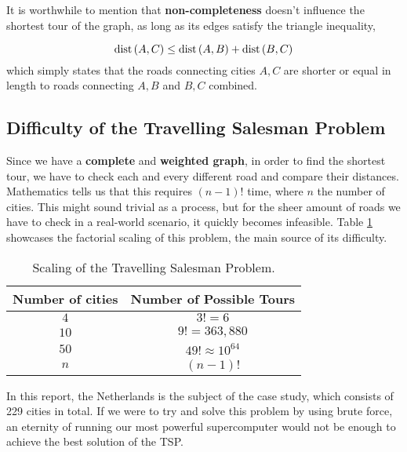 It is worthwhile to mention that \textbf{non-completeness} doesn't influence the shortest tour of the graph, as long as its edges satisfy the triangle inequality,

\[
	\operatorname*{dist}{(A, C)} \leq \operatorname*{dist}{(A, B)} + \operatorname*{dist}{(B, C)}
\]
which simply states that the roads connecting cities \( A, C \) are shorter or equal in length to roads connecting \(A, B\) and \(B, C\) combined.

\subsection{Difficulty of the Travelling Salesman Problem}
Since we have a \textbf{complete} and \textbf{weighted graph}, in order to find the shortest tour, we have to check each and every different road and compare their distances. Mathematics tells us that this requires \( (n-1)! \) time, where \( n \) the number of cities. This might sound trivial as a process, but for the sheer amount of roads we have to check in a real-world scenario, it quickly becomes infeasible. Table \ref{table: factorial_growth} showcases the factorial scaling of this problem, the main source of its difficulty.

\begin{table}
	\centering
	\begin{tabular}{|c|c|}
		\hline
		\textbf{Number of cities}	&	\textbf{Number of Possible Tours} \\
		\hline
		\( 4 \)						&	\( 3! = 6 \)				\\
		\( 10 \)					&	\( 9! = 363,880 \)			\\
		\( 50 \)					&	\( 49! \approx 10^{64} \)	\\
		\( n \)						&	\( (n-1)! \)				\\
		\hline
	\end{tabular}
	\caption{Scaling of the Travelling Salesman Problem.}
	\label{table: factorial_growth}
\end{table}

In this report, the Netherlands is the subject of the case study, which consists of 229 cities in total. If we were to try and solve this problem by using brute force, an eternity of running our most powerful supercomputer would not be enough to achieve the best solution of the TSP.
